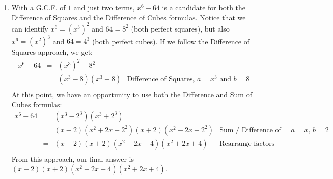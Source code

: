 \documentclass{ximera}
\begin{document}
\begin{example}
\begin{explanation}
\begin{enumerate}
\[\begin{array}{rclr}
81 - 16t^4 & = & 9^2 - (4t^2)^2 & \\
           & = & (9-4t^2)(9+4t^2) & \text{Difference of Squares, $a = 9$, $b = 4t^2$} \\ \end{array}\] At this point, we have an opportunity to proceed further.  Identifying $9 = 3^2$ and $4t^2 = (2t)^2$, we see that we have another difference of squares in the first quantity, which we can reduce. (The sum of two squares in the second quantity \underline{cannot} be factored over the rationals.) \[ \begin{array}{rclr}
81 - 16t^4 & = & (9-4t^2)(9+4t^2) & \\
           & = & (3^2 - (2t)^2) (9 + 4t^2) & \\
					 & = & (3 - 2t)(3+2t)(9 + 4t^2) & \text{Difference of Squares, $a = 3$, $b = 2t$} \\ \end{array} \] As always, the reader is encouraged to multiply out $(3 - 2t)(3+2t)(9 + 4t^2)$ to check the result.

\item  With a G.C.F. of $1$ and just two terms, $x^6 - 64$ is a candidate for both the Difference of Squares and the Difference of Cubes formulas.  Notice that we can identify $x^6 = (x^3)^2$ and $64 = 8^2$ (both perfect squares), but also $x^6 = (x^2)^3$ and $64 = 4^3$ (both perfect cubes).  If we follow the Difference of Squares approach, we get: \[ \begin{array}{rclr}

x^6 - 64 & = & (x^3)^2 - 8^2 & \\
         & = & (x^3 - 8)(x^3 + 8) & \text{Difference of Squares, $a = x^3$ and $b = 8$} \\ \end{array} \] At this point, we have an opportunity to use both the Difference and Sum of Cubes formulas: \[ \begin{array}{rclr}

x^6 - 64 & = & (x^3 - 2^3)(x^3 + 2^3) & \\
         & = & (x-2)(x^2+2x+2^2)(x+2)(x^2 - 2x + 2^2) & \text{Sum / Difference of Cubes, $a = x$, $b = 2$} \\ 
				 & = & (x-2)(x+2)(x^2-2x+4)(x^2+2x+4) & \text{Rearrange factors} \\ 
\end{array} \] From this approach, our final answer is $(x-2)(x+2)(x^2-2x+4)(x^2+2x+4)$.  

 


\end{enumerate}
\end{explanation}
\end{example}
\end{document}
